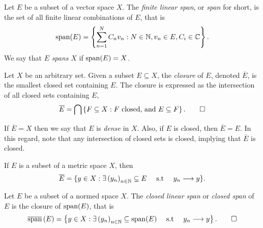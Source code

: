 \documentclass[../thesis.tex]{subfiles}
\begin{document}
\begin{definition}[Span]\label{def:span}  %
    Let $E$ be a subset of a vector space $X$. The \emph{finite linear span}, or \emph{span} for short, is the set of all finite linear combinations of $E$, that is
    \begin{equation*}
        \operatorname{span}(E)=\left\{\sum_{n=1}^N C_n v_n : N \in \mathbb{N}, v_n \in E, C_i \in \mathbb{C}\right\}.
    \end{equation*}
    We say that $E$ \emph{spans} $X$ if $\operatorname{span}(E) = X$.
\end{definition}

\begin{definition}[Closure]\label{def:closure}  %
    Let $X$ be an arbitrary set. Given a subset $E \subseteq X$, the \emph{closure} of $E$, denoted $\overline{E}$, is the smallest closed set containing $E$. The closure is expressed as the intersection of all closed sets containing $E$,
    \begin{equation*}
        \overline{E} = \bigcap \left\{F \subseteq X : F \text{ closed, and } E \subseteq F\right\}. \qedhere
    \end{equation*}
\end{definition}
If $\overline{E} = X$ then we say that $E$ is \emph{dense} in $X$. Also, if $E$ is closed, then $\overline{E}=E$. In this regard, note that any intersection of closed sets is closed, implying that $\overline{E}$ is closed.
\begin{remark} %
    If $E$ is a subset of a metric space $X$, then
    \begin{equation*} %
        \overline{E} = \{ y \in X : \exists \space \bracMed{y_n}_{n\in \N} \subseteq E \quad \text{ s.t }\quad y_n \longrightarrow y\}.
    \end{equation*}
\end{remark}

\begin{definition}\label{def:closed_span}  %
    Let $E$ be a subset of a normed space $X$. The \emph{closed linear span} or \emph{closed span} of $E$ is the closure of $\operatorname{span}(E)$, that is
    \begin{equation*}
        \overline{\operatorname{span}}\left(E\right) = \left\{y\in X: \exists \space \left(y_n\right)_{n\in \mathbb{N}} \subseteq \operatorname{span}(E) \quad \text{ s.t } \quad y_n \longrightarrow y\right\}. \qedhere
    \end{equation*}
\end{definition}
\end{document}
